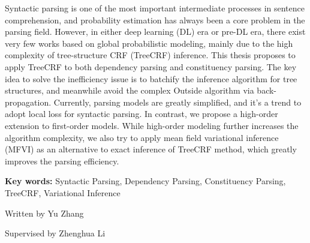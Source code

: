 
\begin{eabstract}
	Syntactic parsing is one of the most important intermediate processes in sentence comprehension,
	and probability estimation has always been a core problem in the parsing field.
	However, in either deep learning (DL) era or pre-DL era, there exist very few works based on global probabilistic modeling, mainly due to the high complexity of tree-structure CRF (TreeCRF) inference.
	This thesis proposes to apply TreeCRF to both dependency parsing and constituency parsing.
	The key idea to solve the inefficiency issue is to batchify the inference algorithm for tree structures, and meanwhile avoid the complex Outside algorithm via back-propagation.
	Currently, parsing models are greatly simplified, and it's a trend to adopt local loss for syntactic parsing.
	In contrast, we propose a high-order extension to first-order models.
	While high-order modeling further increases the algorithm complexity, we also try to apply mean field variational inference (MFVI) as an alternative to exact inference of TreeCRF method, which greatly improves the parsing efficiency.

	\vskip 21bp
	{\bf{} Key words: }
	Syntactic Parsing,
	Dependency Parsing,
	Constituency Parsing,
	TreeCRF,
	Variational Inference
\end{eabstract}

\begin{flushright}
	Written by Yu Zhang
	
	Supervised by Zhenghua Li
\end{flushright}
